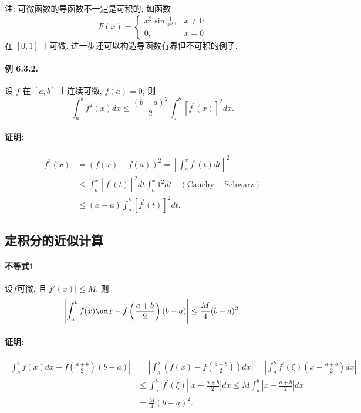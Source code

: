 注: 可微函数的导函数不一定是可积的, 如函数 
\[
F(x)=\begin{cases}
	x^{2}\sin\frac{1}{x^{2}}, & x\neq0\\
	0, & x=0
\end{cases}
\]
在 $[0,1]$ 上可微. 进一步还可以构造导函数有界但不可积的例子.

\paragraph{例 6.3.2. }

设 $f$ 在 $[a,b]$ 上连续可微, $f(a)=0$, 则 
\[
\int_{a}^{b}f^{2}(x)dx\leqslant\frac{(b-a)^{2}}{2}\int_{a}^{b}\left[f^{\prime}(x)\right]^{2}dx.
\]


\paragraph{证明:}

\[
\begin{aligned}f^{2}(x) & =(f(x)-f(a))^{2}=\left[\int_{a}^{x}f^{\prime}(t)dt\right]^{2}\\
	& \leqslant\int_{a}^{x}\left[f^{\prime}(t)\right]^{2}dt\int_{a}^{x}1^{2}dt\quad(\text{Cauchy}-\text{Schwarz})\\
	& \leqslant(x-a)\int_{a}^{b}\left[f^{\prime}(t)\right]^{2}dt.
\end{aligned}
\]


\subsection{定积分的近似计算}

\paragraph{不等式1}

设$f$可微, 且$\left|f'(x)\right|\le M$, 则
\[
\left|\int_{a}^{b}f(x)\ud x-f\left(\frac{a+b}{2}\right)(b-a)\right|\le\frac{M}{4}(b-a)^{2}.
\]


\paragraph{证明:}

\[
\begin{aligned}\left|\int_{a}^{b}f(x)dx-f\left(\frac{a+b}{2}\right)(b-a)\right| & =\left|\int_{a}^{b}\left(f(x)-f\left(\frac{a+b}{2}\right)\right)dx\right|=\left|\int_{a}^{b}f^{\prime}(\xi)\left(x-\frac{a+b}{2}\right)dx\right|\\
	& \leqslant\int_{a}^{b}\left|f^{\prime}(\xi)\right|\left|x-\frac{a+b}{2}\right|dx\leqslant M\int_{a}^{b}\left|x-\frac{a+b}{2}\right|dx\\
	& =\frac{M}{4}(b-a)^{2}.
\end{aligned}
\]


